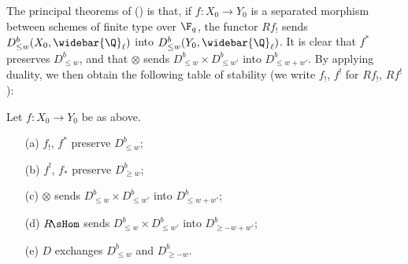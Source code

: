 The principal theorems of \cite{Deligne_WeilII} (\cite[3.3.1, 6.2.3]{Deligne_WeilII}) is that, if $f:X_0\to Y_0$ is a separated morphism between schemes of finite type over $\F_q$, the functor $Rf_!$ sends $D^b_{\leq w}(X_0,\widebar{\Q}_\ell)$ into $D^b_{\leq w}(Y_0,\widebar{\Q}_\ell)$. It is clear that $f^*$ preserves $D^b_{\leq w}$, and that $\otimes$ sends $D^b_{\leq w}\times D^b_{\leq w'}$ into $D^{b}_{\leq w+w'}$. By applying duality, we then obtain the following table of stability (we write $f_!$, $f^!$ for $Rf_!$, $Rf^!$):

\begin{proposition}\label{scheme perverse sheaf functor stability on weight}
Let $f:X_0\to Y_0$ be as above.
\begin{enumerate}
    \item[(a)] $f_!$, $f^*$ preserve $D^b_{\leq w}$;
    \item[(b)] $f^!$, $f_*$ preserve $D^b_{\geq w}$;
    \item[(c)] $\otimes$ sends $D^b_{\leq w}\times D^b_{\leq w'}$ into $D^{b}_{\leq w+w'}$;
    \item[(d)] $R\!\sHom$ sends $D^b_{\leq w}\times D^b_{\leq w'}$ into $D^{b}_{\geq -w+w'}$;
    \item[(e)] $D$ exchanges $D^b_{\leq w}$ and $D^b_{\geq-w}$.   
\end{enumerate}
\end{proposition}


